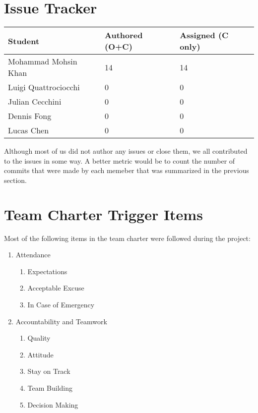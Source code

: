 \documentclass{article}
\begin{document}

\section{Issue Tracker}


\begin{table}[H]
\centering
\begin{tabular}{lll}
\toprule
\textbf{Student} & \textbf{Authored (O+C)} & \textbf{Assigned (C only)}\\
\midrule
Mohammad Mohsin Khan & 14 & 14 \\
Luigi Quattrociocchi & 0 & 0 \\
Julian Cecchini & 0 & 0 \\
Dennis Fong & 0 & 0 \\
Lucas Chen & 0 & 0 \\
\bottomrule
\end{tabular}
\end{table}

Although most of us did not author any issues or close them, we all contributed
to the issues in some way. A better metric would be to count the number of
commits that were made by each memeber that was summarized in the previous
section.

\section{Team Charter Trigger Items}

Most of the following items in the team charter were followed during the project:
\begin{enumerate}
    \item Attendance
    \begin{enumerate}
        \item Expectations
        \item Acceptable Excuse
        \item In Case of Emergency
    \end{enumerate}
    \item Accountability and Teamwork
    \begin{enumerate}
        \item Quality
        \item Attitude
        \item Stay on Track
        \item Team Building
        \item Decision Making
    \end{enumerate}
\end{enumerate}
\end{document}
